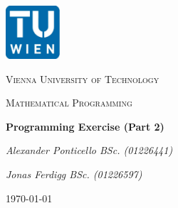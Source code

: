 
\begin{titlepage}
	\centering
	\includegraphics[width=0.15\textwidth]{./img/logo_tuwien.png}\par\vspace{1cm}
	{\scshape\LARGE Vienna University of Technology \par}
	\vspace{1cm}
	{\scshape\Large Mathematical Programming \par}
	\vspace{1.5cm}
	{\huge\bfseries Programming Exercise (Part 2)  \par}
	\vspace{2cm}
	{\Large\itshape Alexander Ponticello BSc. (01226441) \par}
	{\Large\itshape Jonas Ferdigg BSc. (01226597) \par}
	\vfill
	\vspace*{1ex}
	{\large \today\par}
\end{titlepage}

